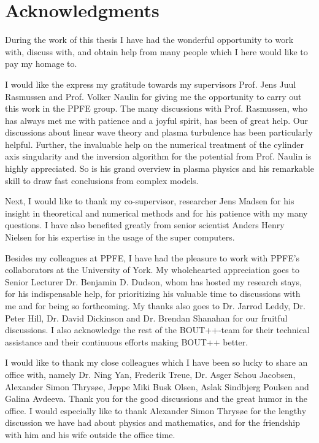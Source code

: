 \chapter*{Acknowledgments}
%
During the work of this thesis I have had the wonderful opportunity to work with, discuss with, and obtain help from many people which I here would like to pay my homage to.

I would like the express my gratitude towards my supervisors Prof. Jens Juul Rasmussen and Prof. Volker Naulin for giving me the opportunity to carry out this work in the PPFE group.
The many discussions with Prof. Rasmussen, who has always met me with patience and a joyful spirit, has been of great help.
Our discussions about linear wave theory and plasma turbulence has been particularly helpful.
Further, the invaluable help on the numerical treatment of the cylinder axis singularity and the inversion algorithm for the potential from Prof. Naulin is highly appreciated.
So is his grand overview in plasma physics and his remarkable skill to draw fast conclusions from complex models.

Next, I would like to thank my co-supervisor, researcher Jens Madsen for his insight in theoretical and numerical methods and for his patience with my many questions.
I have also benefited greatly from senior scientist Anders Henry Nielsen for his expertise in the usage of the super computers.

Besides my colleagues at PPFE, I have had the pleasure to work with PPFE's collaborators at the University of York.
My wholehearted appreciation goes to Senior Lecturer Dr. Benjamin D. Dudson, whom has hosted my research stays, for his indispensable help, for prioritizing his valuable time to discussions with me and for being so forthcoming.
My thanks also goes to Dr. Jarrod Leddy, Dr. Peter Hill, Dr. David Dickinson and Dr. Brendan Shanahan for our fruitful discussions.
I also acknowledge the rest of the BOUT++-team for their technical assistance and their continuous efforts making BOUT++ better.

I would like to thank my close colleagues which I have been so lucky to share an office with, namely Dr. Ning Yan, Frederik Treue, Dr. Asger Schou Jacobsen, Alexander Simon Thrys{\o}e, Jeppe Miki Busk Olsen, Aslak Sindbjerg Poulsen and Galina Avdeeva. Thank you for the good discussions and the great humor in the office.
I would especially like to thank Alexander Simon Thrys{\o}e for the lengthy discussion we have had about physics and mathematics, and for the friendship with him and his wife outside the office time.

